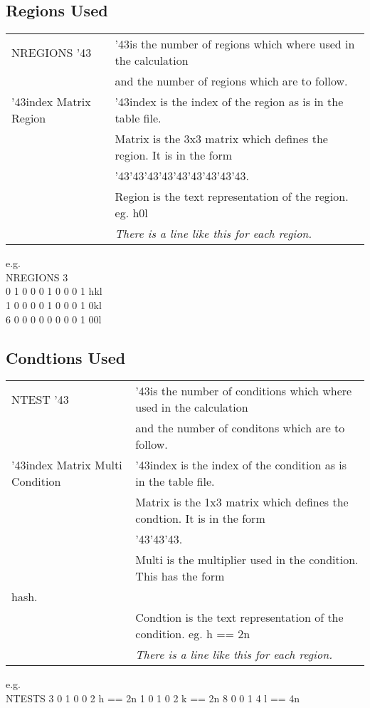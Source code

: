 \documentclass[11pt]{article}
\newcommand{\hash}{\char '43} %
\begin{document}
\subsection{Regions Used}
\begin{table}[h]
\begin{tabular}{|l|l|}\hline
NREGIONS \hash & \hash is the number of regions which where used in the calculation\\
		&	and the number of regions which are to follow.\\
\hline
\hash index Matrix Region & \hash index is the index of the region as is in the table file.\\
					& Matrix is the 3x3 matrix which defines the region. It is in the form\\
					& \hash  \hash  \hash  \hash  \hash  \hash  \hash  \hash  \hash.\\
					& Region is the text representation of the region. eg. h0l\\
					& \emph{There is a line like this for each region.}\\
\hline
\end{tabular}
\end{table}
e.g.\\
NREGIONS 3\\
0 1 0 0 0 1 0 0 0 1 hkl\\
1 0 0 0 0 1 0 0 0 1 0kl\\
6 0 0 0 0 0 0 0 0 1 00l
\subsection{Condtions Used}
\begin{table}[h]
\begin{tabular}{|l|l|}\hline
NTEST \hash & \hash is the number of conditions which where used in the calculation\\
		&	and the number of conditons which are to follow.\\
\hline
\hash index Matrix Multi Condition & \hash index is the index of the condition as is in the table file.\\
					& Matrix is the 1x3 matrix which defines the condtion. It is in the form\\
					& \hash  \hash  \hash.\\
					& Multi is the multiplier used in the condition. This has the form \\hash.\\
					& Condtion is the text representation of the condition. eg. h == 2n\\
					& \emph{There is a line like this for each region.}\\
\hline
\end{tabular}
\end{table}
e.g.\\
NTESTS 3
0 1 0 0 2 h == 2n
1 0 1 0 2 k == 2n
8 0 0 1 4 l == 4n
\end{document}
